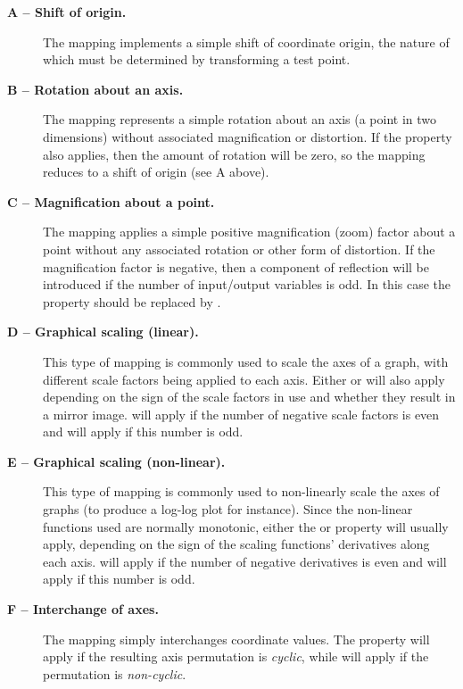 \begin{description}

\item[{\bf A -- Shift of origin.}] The mapping implements a simple shift of
coordinate origin, the nature of which must be determined by transforming a
test point. 

\item[{\bf B -- Rotation about an axis.}] The mapping represents a
simple rotation about an axis (a point in two dimensions) without
associated magnification or distortion.
If the  property also applies, then the amount of rotation
will be zero, so the mapping reduces to a shift of origin (see A above). 

\item[{\bf C -- Magnification about a point.}] The mapping applies a
simple positive magnification (zoom) factor about a point without any
associated rotation or other form of distortion. 
If the magnification factor is negative, then a component of reflection will
be introduced if the number of input/output variables is odd.
In this case the  property should be replaced by 
.

\item[{\bf D -- Graphical scaling (linear).}] This type of mapping is
commonly used to scale the axes of a graph, with different scale factors
being applied to each axis. 
Either  or  will also apply depending
on the sign of the scale factors in use and whether they result in a mirror
image. 
 will apply if the number of negative scale factors is
even and  will apply if this number is odd. 

\item[{\bf E -- Graphical scaling (non-linear).}] This type of mapping is
commonly used to non-linearly scale the axes of graphs (to produce a
log-log plot for instance).
Since the non-linear functions used are normally monotonic, either the
 or  property will usually apply,
depending on the sign of the scaling functions' derivatives along each axis.
 will apply if the number of negative derivatives is
even and  will apply if this number is odd. 

\item[{\bf F -- Interchange of axes.}] The mapping simply interchanges
coordinate values. 
The  property will apply if the resulting axis
permutation is {\em cyclic}, while  will apply if the
permutation is {\em non-cyclic}. 


\end{description}

